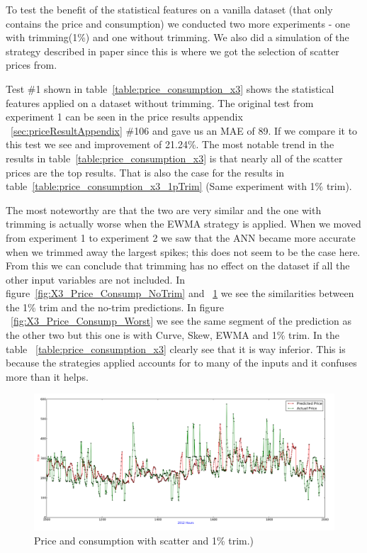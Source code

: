 To test the benefit of the statistical features on a vanilla dataset (that only contains the price and consumption) we conducted two more experiments - one with trimming(1\%) and one without trimming. We also did a simulation of the strategy described in paper \cite{singhal2011electricity} since this is where we got the selection of scatter prices from.

Test \#1 shown in table~\ref{table:price_consumption_x3} shows the statistical features applied on a dataset without trimming. The original test from experiment 1 can be seen in the price results appendix ~\ref{sec:priceResultAppendix} \#106 and gave us an MAE of 89. If we compare it to this test we see and improvement of 21.24\%. The most notable trend in the results in table~\ref{table:price_consumption_x3} is that nearly all of the scatter prices are the top results. That is also the case for the results in table~\ref{table:price_consumption_x3_1pTrim} (Same experiment with 1\% trim).

The most noteworthy are that the two are very similar and the one with trimming is actually worse when the EWMA strategy is applied. When we moved from experiment 1 to experiment 2 we saw that the ANN became more accurate when we trimmed away the largest spikes; this does not seem to be the case here. From this we can conclude that trimming has no effect on the dataset if all the other input variables are not included. In figure~\ref{fig:X3_Price_Consump_NoTrim} and ~\ref{fig:X3_Price_Consump_1pTrim} we see the similarities between the 1\% trim and the no-trim predictions. In figure ~\ref{fig:X3_Price_Consump_Worst} we see the same segment of the prediction as the other two but this one is with Curve, Skew, EWMA and 1\% trim. In the table ~\ref{table:price_consumption_x3} clearly see that it is way inferior. This is because the strategies applied accounts for to many of the inputs and it confuses more than it helps.

\begin{figure}[H]
\centering
\includegraphics[width=\linewidth,natwidth=898,natheight=587]{billeder/PriceExperimentalAnalysis/X3_Price_Consump_1pTrim.png}
\caption{Price and consumption with scatter and 1\% trim.)}
\label{fig:X3_Price_Consump_1pTrim}
\end{figure}

